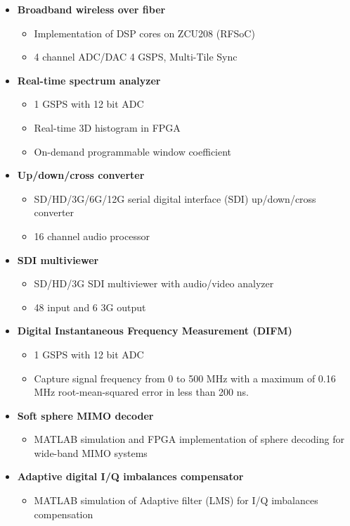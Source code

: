 
\begin{itemize}
	\item \textbf{Broadband wireless over fiber}
	      \begin{itemize}
		      \item Implementation of DSP cores on ZCU208 (RFSoC)
		      \item 4 channel ADC/DAC 4 GSPS, Multi-Tile Sync 
	      \end{itemize}
	\item \textbf{Real-time spectrum analyzer}
	      \begin{itemize}
		      \item 1 GSPS with 12 bit ADC
		      \item Real-time 3D histogram in FPGA
		      \item On-demand programmable window coefficient
	      \end{itemize}
	\item \textbf{Up/down/cross converter}
	      \begin{itemize}
		      \item SD/HD/3G/6G/12G serial digital interface (SDI) up/down/cross converter
		      \item 16 channel audio processor
	      \end{itemize}
	\item \textbf{SDI multiviewer}
	      \begin{itemize}
		      \item SD/HD/3G SDI multiviewer with audio/video analyzer 
		      \item 48 input and 6 3G output
	      \end{itemize}
	\item \textbf{Digital Instantaneous Frequency Measurement (DIFM)}
	      \begin{itemize}
		      \item 1 GSPS with 12 bit ADC
		      \item Capture signal frequency from 0 to 500 MHz with a maximum of 0.16 MHz root-mean-squared error in less than 200 ns.
	      \end{itemize}
	\item \textbf{Soft sphere MIMO decoder}
	      \begin{itemize}
		      \item MATLAB simulation and FPGA implementation of sphere decoding for wide-band MIMO systems
	      \end{itemize}
	\item \textbf{Adaptive digital I/Q imbalances compensator}
	      \begin{itemize}
		      \item MATLAB simulation of Adaptive filter (LMS) for I/Q imbalances compensation
	      \end{itemize}
\end{itemize}
